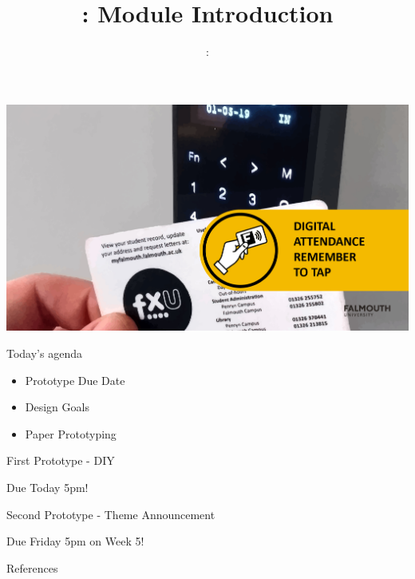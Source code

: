\usepackage{../../beamerthemeFalmouthGamesAcademy}
\usepackage{multimedia}
\graphicspath{ {../../} }


\usepackage[normalem]{ulem}
\usepackage{wasysym}
\usepackage{graphicx} %

\usepackage{pdfpages}

\usetikzlibrary{arrows,automata}





\title{\sessionnumber: Module Introduction}
\subtitle{\modulecode: \moduletitle}

\begin{frame}
	\includegraphics[width=1.0\textwidth]{sign-in}
\end{frame}

\frame{\titlepage} 


\begin{frame}{Today's agenda}
	\begin{itemize}
		\item Prototype Due Date
		\item Design Goals
		\item Paper Prototyping
	\end{itemize}
\end{frame}

\begin{frame}{First Prototype - DIY}
\begin{center}
	\Huge{Due Today 5pm!}
\end{center}
\end{frame}




\begin{frame}{Second Prototype - Theme Announcement}
\begin{center}
	\Huge{Due Friday 5pm on Week 5!}
\end{center}
\end{frame}

\begin{frame}{References}
\end{frame}


